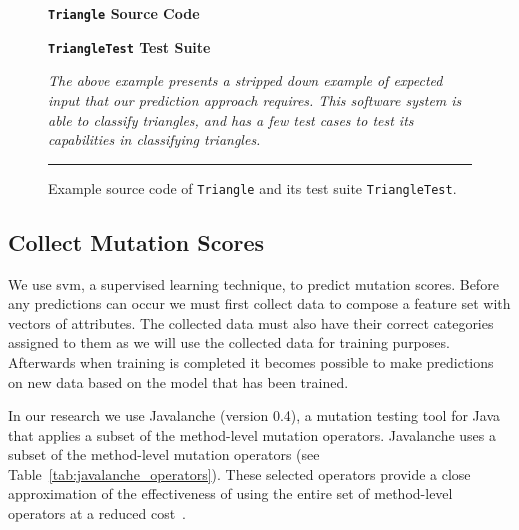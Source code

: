 \begin{figure}[!tb]
  \centering
  \begin{minipage}[t]{7.25cm}
  \centering
  \footnotesize{\textbf{\texttt{Triangle} Source Code}}
  
  \end{minipage}
  \hfill
  \begin{minipage}[t]{7.25cm}
  \centering
  \footnotesize{\textbf{\texttt{TriangleTest} Test Suite}}
  
  \end{minipage}
  \caption{Example source code of \texttt{Triangle} and its test suite \texttt{TriangleTest}.}
  \vspace{1mm}
  \footnotesize{\emph{The above example presents a stripped down example of expected input that our prediction approach requires. This software system is able to classify triangles, and has a few test cases to test its capabilities in classifying triangles.}}
  \vspace{2mm}
  \hrule
  \label{fig:triangle_example}
\end{figure}


\subsection{Collect Mutation Scores}
\label{subsec:approach_collect_mutation_scores}
We use \gls{svm}, a supervised learning technique, to predict mutation scores. Before any predictions can occur we must first collect data to compose a feature set with vectors of attributes. The collected data must also have their correct categories assigned to them as we will use the collected data for training purposes. Afterwards when training is completed it becomes possible to make predictions on new data based on the model that has been trained.

In our research we use Javalanche (version 0.4), a mutation testing tool for Java~\cite{SZ09} that applies a subset of the method-level mutation operators. Javalanche uses a subset of the method-level mutation operators (see Table~\ref{tab:javalanche_operators}). These selected operators provide a close approximation of the effectiveness of using the entire set of method-level operators at a reduced cost~\cite{OLR+96}.

